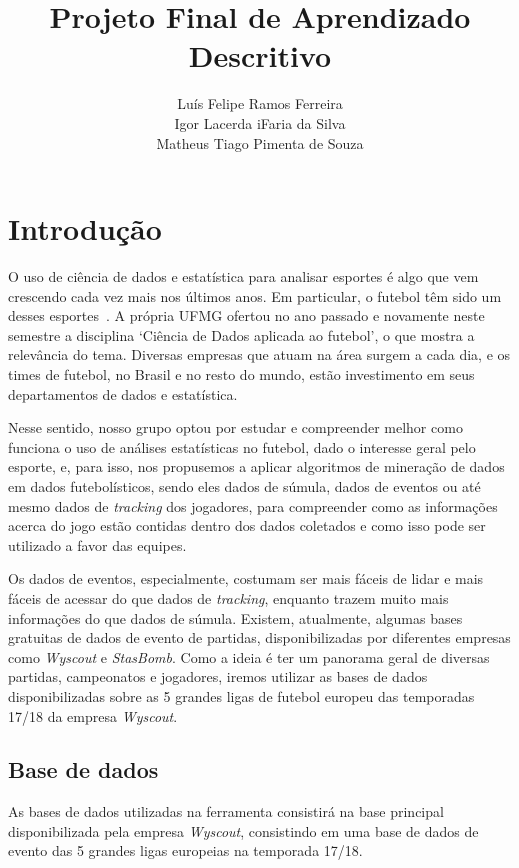 \documentclass{article}
\title{Projeto Final de Aprendizado Descritivo}
\author{Luís Felipe Ramos Ferreira \\  Igor Lacerda iFaria da Silva \\ Matheus
    Tiago Pimenta de Souza}
\date{}
\begin{document}
\maketitle

\section{Introdução}

O uso de ciência de dados e estatística para analisar esportes é algo que vem
crescendo cada vez mais nos últimos anos. Em
particular, o futebol têm sido um desses
esportes~\cite{takvorian2021beautiful}. A própria UFMG ofertou no
ano passado e novamente neste semestre a disciplina `Ciência de Dados aplicada
ao futebol', o que mostra a relevância do tema. Diversas empresas que atuam na
área surgem a cada dia, e os times de futebol, no Brasil e no resto do
mundo, estão investimento em seus departamentos de dados e estatística.

Nesse sentido, nosso grupo optou por estudar e compreender melhor como funciona
o uso de análises estatísticas no futebol, dado o interesse geral pelo esporte,
e, para isso, nos propusemos a aplicar algoritmos de mineração de dados em
dados futebolísticos, sendo eles dados de súmula, dados de eventos ou até mesmo
dados de
\textit{tracking} dos jogadores, para compreender como as informações acerca do
jogo estão contidas dentro dos dados coletados e como isso pode ser utilizado a
favor das equipes.

Os dados de eventos, especialmente, costumam ser mais fáceis de lidar e mais
fáceis de acessar do que dados de \textit{tracking}, enquanto trazem muito mais
informações do que dados de súmula. Existem, atualmente, algumas bases
gratuitas de dados de evento de partidas, disponibilizadas por diferentes
empresas como \textit{Wyscout} e \textit{StasBomb}. Como a ideia é ter um
panorama geral de diversas partidas, campeonatos e jogadores, iremos utilizar
as bases de dados disponibilizadas sobre as 5 grandes ligas de futebol europeu
das temporadas 17/18 da empresa \textit{Wyscout}.

\subsection{Base de dados}

As bases de dados utilizadas na ferramenta consistirá na base principal
disponibilizada pela empresa \textit{Wyscout},
consistindo em uma base de dados de evento das 5 grandes ligas europeias na
temporada 17/18.
\end{document}
